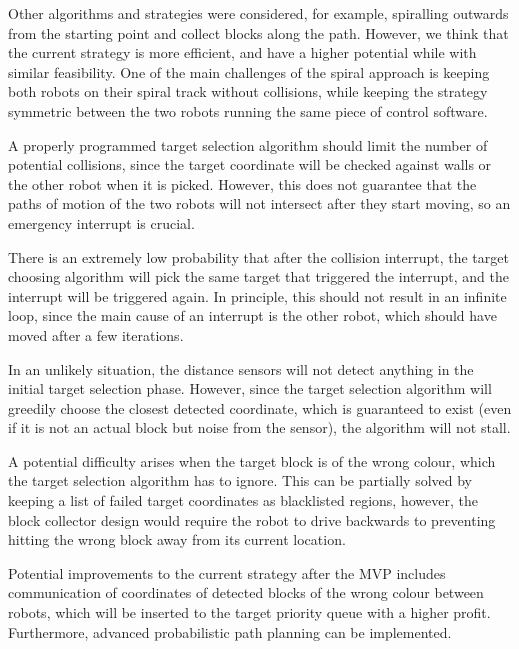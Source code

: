 Other algorithms and strategies were considered, for example, spiralling outwards from the starting point and collect blocks along the path. However, we think that the current strategy is more efficient, and have a higher potential while with similar feasibility. One of the main challenges of the spiral approach is keeping both robots on their spiral track without collisions, while keeping the strategy symmetric between the two robots running the same piece of control software.



A properly programmed target selection algorithm should limit the number of potential collisions, since the target coordinate will be checked against walls or the other robot when it is picked. However, this does not guarantee that the paths of motion of the two robots will not intersect after they start moving, so an emergency interrupt is crucial.

There is an extremely low probability that after the collision interrupt, the target choosing algorithm will pick the same target that triggered the interrupt, and the interrupt will be triggered again. In principle, this should not result in an infinite loop, since the main cause of an interrupt is the other robot, which should have moved after a few iterations.

In an unlikely situation, the distance sensors will not detect anything in the initial target selection phase. However, since the target selection algorithm will greedily choose the closest detected coordinate, which is guaranteed to exist (even if it is not an actual block but noise from the sensor), the algorithm will not stall.





A potential difficulty arises when the target block is of the wrong colour, which the target selection algorithm has to ignore. This can be partially solved by keeping a list of failed target coordinates as blacklisted regions, however, the block collector design would require the robot to drive backwards to preventing hitting the wrong block away from its current location.






Potential improvements to the current strategy after the MVP includes communication of coordinates of detected blocks of the wrong colour between robots, which will be inserted to the target priority queue with a higher profit. Furthermore, advanced probabilistic path planning can be implemented. 


